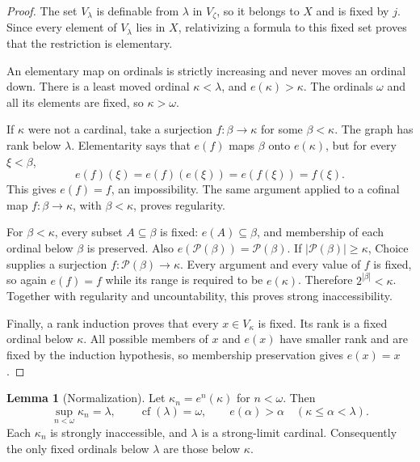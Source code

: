 \documentclass[11pt,letterpaper]{article}
\theoremstyle{definition}
\newtheorem{lemma}[definition]{Lemma}
\numberwithin{equation}{section}
\newcommand{\cf}{\operatorname{cf}}
\newcommand{\Pow}{\mathcal P}
\begin{document}
\begin{proof}
The set $V_\lambda$ is definable from $\lambda$ in $V_\zeta$, so it belongs to $X$ and is fixed by $j$. Since every element of $V_\lambda$ lies in $X$, relativizing a formula to this fixed set proves that the restriction is elementary.

An elementary map on ordinals is strictly increasing and never moves an ordinal down. There is a least moved ordinal $\kappa<\lambda$, and $e(\kappa)>\kappa$. The ordinals $\omega$ and all its elements are fixed, so $\kappa>\omega$.

If $\kappa$ were not a cardinal, take a surjection $f:\beta\to\kappa$ for some $\beta<\kappa$. The graph has rank below $\lambda$. Elementarity says that $e(f)$ maps $\beta$ onto $e(\kappa)$, but for every $\xi<\beta$,
\[
 e(f)(\xi)=e(f)(e(\xi))=e(f(\xi))=f(\xi).
\]
This gives $e(f)=f$, an impossibility. The same argument applied to a cofinal map $f:\beta\to\kappa$, with $\beta<\kappa$, proves regularity.

For $\beta<\kappa$, every subset $A\subseteq\beta$ is fixed: $e(A)\subseteq\beta$, and membership of each ordinal below $\beta$ is preserved. Also $e(\Pow(\beta))=\Pow(\beta)$. If $|\Pow(\beta)|\ge\kappa$, Choice supplies a surjection $f:\Pow(\beta)\to\kappa$. Every argument and every value of $f$ is fixed, so again $e(f)=f$ while its range is required to be $e(\kappa)$. Therefore $2^{|\beta|}<\kappa$. Together with regularity and uncountability, this proves strong inaccessibility.

Finally, a rank induction proves that every $x\in V_\kappa$ is fixed. Its rank is a fixed ordinal below $\kappa$. All possible members of $x$ and $e(x)$ have smaller rank and are fixed by the induction hypothesis, so membership preservation gives $e(x)=x$.
\end{proof}

\begin{lemma}[Normalization]\label{lem:normal}
Let $\kappa_n=e^n(\kappa)$ for $n<\omega$. Then
\begin{equation}\label{eq:normal}
 \sup_{n<\omega}\kappa_n=\lambda,
 \qquad\cf(\lambda)=\omega,
 \qquad e(\alpha)>\alpha\quad(\kappa\le\alpha<\lambda).
\end{equation}
Each $\kappa_n$ is strongly inaccessible, and $\lambda$ is a strong-limit cardinal. Consequently the only fixed ordinals below $\lambda$ are those below $\kappa$.
\end{lemma}
\end{document}
